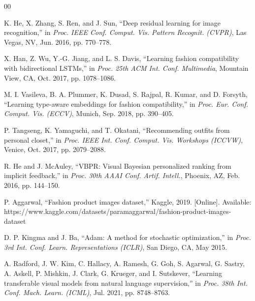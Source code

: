 \documentclass[conference]{IEEEtran}
\begin{document}
\begin{thebibliography}{00}

K. He, X. Zhang, S. Ren, and J. Sun, ``Deep residual learning for image recognition,'' in \textit{Proc. IEEE Conf. Comput. Vis. Pattern Recognit. (CVPR)}, Las Vegas, NV, Jun. 2016, pp. 770--778.

X. Han, Z. Wu, Y.-G. Jiang, and L. S. Davis, ``Learning fashion compatibility with bidirectional LSTMs,'' in \textit{Proc. 25th ACM Int. Conf. Multimedia}, Mountain View, CA, Oct. 2017, pp. 1078--1086.

M. I. Vasileva, B. A. Plummer, K. Dusad, S. Rajpal, R. Kumar, and D. Forsyth, ``Learning type-aware embeddings for fashion compatibility,'' in \textit{Proc. Eur. Conf. Comput. Vis. (ECCV)}, Munich, Sep. 2018, pp. 390--405.

P. Tangseng, K. Yamaguchi, and T. Okatani, ``Recommending outfits from personal closet,'' in \textit{Proc. IEEE Int. Conf. Comput. Vis. Workshops (ICCVW)}, Venice, Oct. 2017, pp. 2079--2088.

R. He and J. McAuley, ``VBPR: Visual Bayesian personalized ranking from implicit feedback,'' in \textit{Proc. 30th AAAI Conf. Artif. Intell.}, Phoenix, AZ, Feb. 2016, pp. 144--150.

P. Aggarwal, ``Fashion product images dataset,'' Kaggle, 2019. [Online]. Available: https://www.kaggle.com/datasets/paramaggarwal/fashion-product-images-dataset

D. P. Kingma and J. Ba, ``Adam: A method for stochastic optimization,'' in \textit{Proc. 3rd Int. Conf. Learn. Representations (ICLR)}, San Diego, CA, May 2015.

A. Radford, J. W. Kim, C. Hallacy, A. Ramesh, G. Goh, S. Agarwal, G. Sastry, A. Askell, P. Mishkin, J. Clark, G. Krueger, and I. Sutskever, ``Learning transferable visual models from natural language supervision,'' in \textit{Proc. 38th Int. Conf. Mach. Learn. (ICML)}, Jul. 2021, pp. 8748--8763.

\end{thebibliography}
\end{document}
